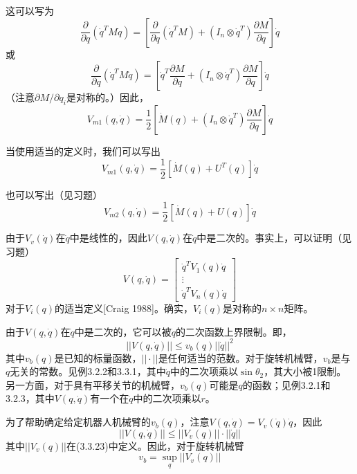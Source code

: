 \documentclass[12pt,a4paper]{ctexart}
\begin{document}
这可以写为
\begin{equation}
\frac{\partial}{\partial q}(\dot{q}^T M \dot{q}) = \left[\frac{\partial}{\partial q}(\dot{q}^T M) + (I_n \otimes \dot{q}^T)\frac{\partial M}{\partial q}\right]\dot{q}
\end{equation}
或
\begin{equation}
\frac{\partial}{\partial q}(\dot{q}^T M \dot{q}) = \left[\dot{q}^T\frac{\partial M}{\partial q} + (I_n \otimes \dot{q}^T)\frac{\partial M}{\partial q}\right]\dot{q}
\end{equation}
（注意$\partial M/\partial q_i$是对称的。）因此，
\begin{equation}
V_{m1}(q,\dot{q}) = \frac{1}{2}\left[\dot{M}(q) + (I_n \otimes \dot{q}^T)\frac{\partial M}{\partial q}\right]\dot{q}
\end{equation}

当使用适当的定义时，我们可以写出
\begin{equation}
V_{m1}(q,\dot{q}) = \frac{1}{2}[\dot{M}(q) + U^T(q)]\dot{q}
\end{equation}

也可以写出（见习题）
\begin{equation}
V_{m2}(q,\dot{q}) = \frac{1}{2}[\dot{M}(q) + U(q)]\dot{q}
\end{equation}

由于$V_v(\dot{q})$在$\dot{q}$中是线性的，因此$V(q,\dot{q})$在$\dot{q}$中是二次的。事实上，可以证明（见习题）
\begin{equation}
V(q,\dot{q}) = \begin{bmatrix} \dot{q}^T V_1(q)\dot{q} \\ \vdots \\ \dot{q}^T V_n(q)\dot{q} \end{bmatrix}
\end{equation}
对于$V_i(q)$的适当定义[Craig 1988]。确实，$V_i(q)$是对称的$n \times n$矩阵。

由于$V(q,\dot{q})$在$\dot{q}$中是二次的，它可以被$\dot{q}$的二次函数上界限制。即，
\begin{equation}
||V(q,\dot{q})|| \leq v_b(q)||\dot{q}||^2
\end{equation}
其中$v_b(q)$是已知的标量函数，$||\cdot||$是任何适当的范数。对于旋转机械臂，$v_b$是与$q$无关的常数。见例3.2.2和3.3.1，其中$\dot{q}$中的二次项乘以$\sin\theta_2$，其大小被1限制。另一方面，对于具有平移关节的机械臂，$v_b(q)$可能是$q$的函数；见例3.2.1和3.2.3，其中$V(q,\dot{q})$有一个在$\dot{q}$中的二次项乘以$r$。

为了帮助确定给定机器人机械臂的$v_b(q)$，注意$V(q,\dot{q}) = V_v(\dot{q})\dot{q}$，因此
\begin{equation}
||V(q,\dot{q})|| \leq ||V_v(q)|| \cdot ||\dot{q}||
\end{equation}
其中$||V_v(q)||$在(3.3.23)中定义。因此，对于旋转机械臂
\begin{equation}
v_b = \sup_{q} ||V_v(q)||
\end{equation}
\end{document}
